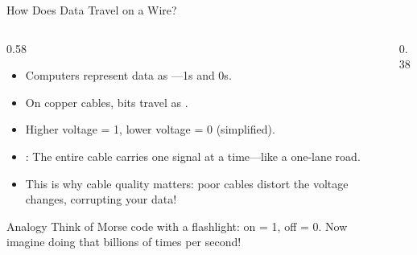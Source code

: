 \documentclass[aspectratio=169]{beamer}  %
\begin{document}
\begin{frame}{How Does Data Travel on a Wire?}
    \begin{columns}[T]
        \begin{column}{0.58\textwidth}
            \begin{itemize}
                \item Computers represent data as ---1s and 0s.
                \item On copper cables, bits travel as .
                \item Higher voltage = 1, lower voltage = 0 (simplified).
                \item {}: The entire cable carries one signal at a time---like a one-lane road.
                \item This is why cable quality matters: poor cables distort the voltage changes, corrupting your data!
            \end{itemize}
            
            \vspace{0.3em}
            \begin{exampleblock}{Analogy}
                Think of Morse code with a flashlight: on = 1, off = 0. Now imagine doing that billions of times per second!
            \end{exampleblock}
        \end{column}
        \begin{column}{0.38\textwidth}
            \begin{center}
\end{center}
\end{column}
\end{columns}
\end{frame}
\end{document}
